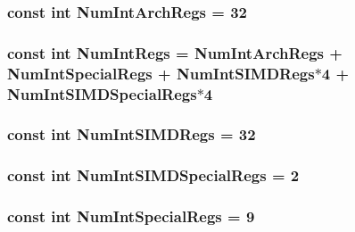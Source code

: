 \label{namespaceMipsISA_a49908eb80616530afc519599ec46e42e}
\hypertarget{namespaceMipsISA_a405c0abe85dc0da846c120e3b31f375c}{
\subsubsection[{NumIntArchRegs}]{\setlength{\rightskip}{0pt plus 5cm}const int {\bf NumIntArchRegs} = 32}}
\label{namespaceMipsISA_a405c0abe85dc0da846c120e3b31f375c}
\hypertarget{namespaceMipsISA_a9c412b5118ce369570c156c4e156638a}{
\subsubsection[{NumIntRegs}]{\setlength{\rightskip}{0pt plus 5cm}const int {\bf NumIntRegs} = {\bf NumIntArchRegs} + {\bf NumIntSpecialRegs} + {\bf NumIntSIMDRegs}$\ast$4 + {\bf NumIntSIMDSpecialRegs}$\ast$4}}
\label{namespaceMipsISA_a9c412b5118ce369570c156c4e156638a}
\hypertarget{namespaceMipsISA_a367be163cb58d552cce5a2be27b6809b}{
\subsubsection[{NumIntSIMDRegs}]{\setlength{\rightskip}{0pt plus 5cm}const int {\bf NumIntSIMDRegs} = 32}}
\label{namespaceMipsISA_a367be163cb58d552cce5a2be27b6809b}
\hypertarget{namespaceMipsISA_a945a32fd39bae07e01f29b83e9b36c56}{
\subsubsection[{NumIntSIMDSpecialRegs}]{\setlength{\rightskip}{0pt plus 5cm}const int {\bf NumIntSIMDSpecialRegs} = 2}}
\label{namespaceMipsISA_a945a32fd39bae07e01f29b83e9b36c56}
\hypertarget{namespaceMipsISA_aa4755d292c82d3f9a290e04202de41de}{
\subsubsection[{NumIntSpecialRegs}]{\setlength{\rightskip}{0pt plus 5cm}const int {\bf NumIntSpecialRegs} = 9}}
